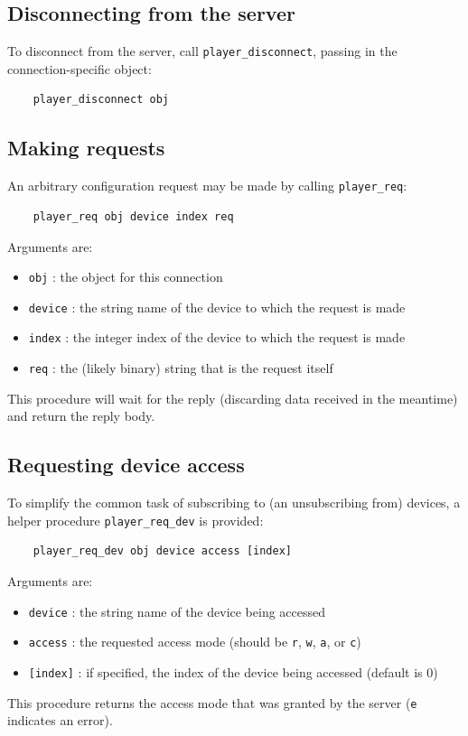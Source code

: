 \documentclass[11pt]{article}
\begin{document}
\subsection{Disconnecting from the server}
To disconnect from the server, call {\tt player\_disconnect}, passing in the
connection-specific object:
\begin{verbatim}
    player_disconnect obj
\end{verbatim}

\subsection{Making requests}
An arbitrary configuration request may be made by calling {\tt player\_req}:
\begin{verbatim}
    player_req obj device index req
\end{verbatim}
Arguments are:
\begin{itemize}
\item {\tt obj} : the object for this connection
\item {\tt device} : the string name of the device to which the request is
made
\item {\tt index} : the integer index of the device to which the request is
made
\item {\tt req} : the (likely binary) string that is the request itself
\end{itemize}
This procedure will wait for the reply (discarding data received in the
meantime) and return the reply body.

\subsection{Requesting device access}
To simplify the common task of subscribing to (an unsubscribing from) devices,
a helper procedure {\tt player\_req\_dev} is provided:
\begin{verbatim}
    player_req_dev obj device access [index]
\end{verbatim}
Arguments are:
\begin{itemize}
\item {\tt device} : the string name of the device being accessed
\item {\tt access} : the requested access mode (should be {\tt r}, {\tt w},
{\tt a}, or {\tt c})
\item {\tt [index]} : if specified, the index of the device being accessed
(default is 0)
\end{itemize}
This procedure returns the access mode that was granted by the server ({\tt e}
indicates an error).
\end{document}
